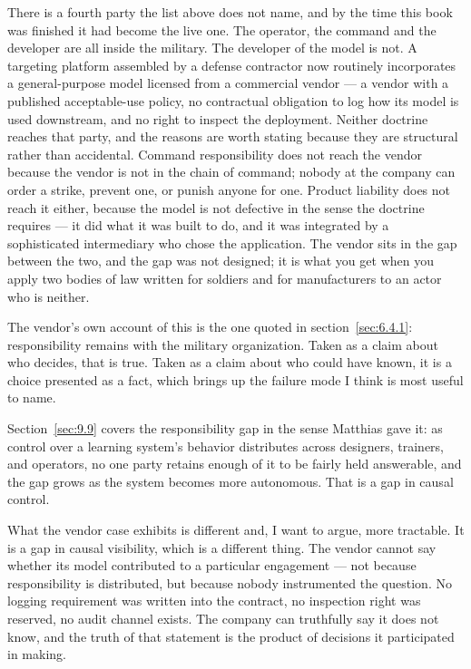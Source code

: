 There is a fourth party the list above does not name, and by the time this book was finished it had become the live one. The operator, the command and the developer are all inside the military. The developer of the model is not. A targeting platform assembled by a defense contractor now routinely incorporates a general-purpose model licensed from a commercial vendor — a vendor with a published acceptable-use policy, no contractual obligation to log how its model is used downstream, and no right to inspect the deployment. Neither doctrine reaches that party, and the reasons are worth stating because they are structural rather than accidental. Command responsibility does not reach the vendor because the vendor is not in the chain of command; nobody at the company can order a strike, prevent one, or punish anyone for one. Product liability does not reach it either, because the model is not defective in the sense the doctrine requires — it did what it was built to do, and it was integrated by a sophisticated intermediary who chose the application. The vendor sits in the gap between the two, and the gap was not designed; it is what you get when you apply two bodies of law written for soldiers and for manufacturers to an actor who is neither.

The vendor's own account of this is the one quoted in section~\ref{sec:6.4.1}: responsibility remains with the military organization. Taken as a claim about who decides, that is true. Taken as a claim about who could have known, it is a choice presented as a fact, which brings up the failure mode I think is most useful to name.

Section~\ref{sec:9.9} covers the responsibility gap in the sense Matthias gave it: as control over a learning system's behavior distributes across designers, trainers, and operators, no one party retains enough of it to be fairly held answerable, and the gap grows as the system becomes more autonomous. That is a gap in causal control.

What the vendor case exhibits is different and, I want to argue, more tractable. It is a gap in causal visibility, which is a different thing. The vendor cannot say whether its model contributed to a particular engagement — not because responsibility is distributed, but because nobody instrumented the question. No logging requirement was written into the contract, no inspection right was reserved, no audit channel exists. The company can truthfully say it does not know, and the truth of that statement is the product of decisions it participated in making.


